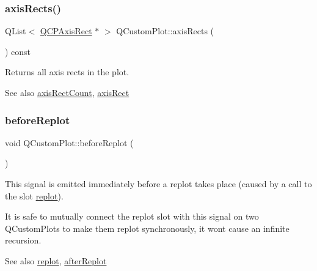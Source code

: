 \subsubsection{\texorpdfstring{axis\+Rects()}{axisRects()}}
{\footnotesize\ttfamily Q\+List$<$ \mbox{\hyperlink{class_q_c_p_axis_rect}{Q\+C\+P\+Axis\+Rect}} $\ast$ $>$ Q\+Custom\+Plot\+::axis\+Rects (\begin{DoxyParamCaption}{ }\end{DoxyParamCaption}) const}

Returns all axis rects in the plot.

\begin{DoxySeeAlso}{See also}
\mbox{\hyperlink{class_q_custom_plot_a8f85940aaac50efb466287d9d2d04ec6}{axis\+Rect\+Count}}, \mbox{\hyperlink{class_q_custom_plot_ae5eefcb5f6ca26689b1fd4f6e25b42f9}{axis\+Rect}} 
\end{DoxySeeAlso}
\mbox{\label{class_q_custom_plot_a0cd30e29b73efd6afe096e44bc5956f5}} 
\subsubsection{\texorpdfstring{before\+Replot}{beforeReplot}}
{\footnotesize\ttfamily void Q\+Custom\+Plot\+::before\+Replot (\begin{DoxyParamCaption}{ }\end{DoxyParamCaption})\hspace{0.3cm}{\ttfamily [signal]}}

This signal is emitted immediately before a replot takes place (caused by a call to the slot \mbox{\hyperlink{class_q_custom_plot_aa4bfe7d70dbe67e81d877819b75ab9af}{replot}}).

It is safe to mutually connect the replot slot with this signal on two Q\+Custom\+Plots to make them replot synchronously, it won\textquotesingle{}t cause an infinite recursion.

\begin{DoxySeeAlso}{See also}
\mbox{\hyperlink{class_q_custom_plot_aa4bfe7d70dbe67e81d877819b75ab9af}{replot}}, \mbox{\hyperlink{class_q_custom_plot_a6f4fa624af060bc5919c5f266cf426a0}{after\+Replot}} 
\end{DoxySeeAlso}
\mbox{\label{class_q_custom_plot_ab0f3abff2d2f7df3668b5836f39207fa}} 
